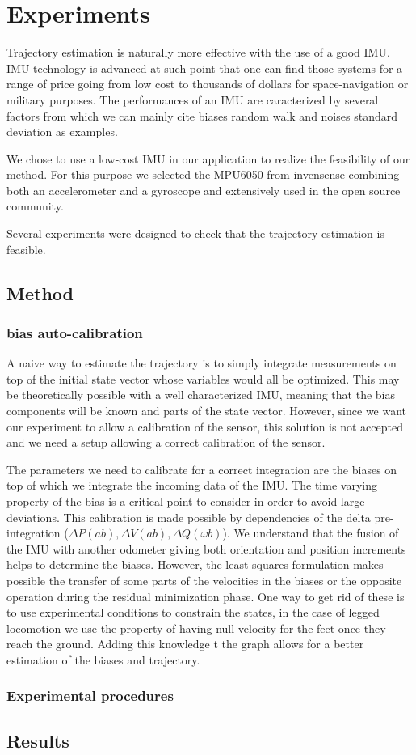 
\section{Experiments} \label{sec:experiments}

Trajectory estimation is naturally more effective with the use of a good IMU. IMU technology is advanced at such point that 
one can find those systems for a range of price going from low cost to thousands of dollars for space-navigation or military purposes.
The performances of an IMU are caracterized by several factors from which we can mainly cite biases random walk and noises standard deviation
as examples.

We chose to use a low-cost IMU in our application to realize the feasibility of our method. For this purpose we selected the 
MPU6050 from invensense combining both an accelerometer and a gyroscope and extensively used in the open source community.

Several experiments were designed to check that the trajectory estimation is feasible.

\subsection{Method}
\subsubsection{bias auto-calibration}
A naive way to estimate the trajectory is to simply integrate measurements on top of the initial state vector whose variables would all be optimized. 
This may be theoretically possible with a well characterized IMU, meaning that the bias components will be known and parts of the state vector.
However, since we want our experiment to allow a calibration of the sensor, this solution is not accepted and we need a setup allowing a correct calibration of the sensor.

The parameters we need to calibrate for a correct integration are the biases on top of which we integrate the incoming data of the IMU.
The time varying property of the bias is a critical point to consider in order to avoid large deviations. This calibration is made possible
by dependencies of the delta pre-integration ($\Delta P(ab), \Delta V(ab), \Delta Q(\omega b)$). We understand that the fusion of the IMU with another odometer giving both
orientation and position increments helps to determine the biases. However, the least squares formulation makes possible the transfer of some parts
of the velocities in the biases or the opposite operation during the residual minimization phase. One way to get rid of these is to use experimental conditions to constrain the states, in the case of legged
locomotion we use the property of having null velocity for the feet once they reach the ground. Adding this knowledge t the graph allows for a
better estimation of the biases and trajectory.

\subsubsection{Experimental procedures}


\subsection{Results}